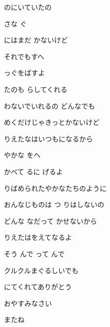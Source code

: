 \documentclass[14pt]{extreport}
\begin{document}
{  のにいていたの
  \jisho{}

  さな ぐ
  \jisho{}

\item
  にはまだ かないけど
  \jisho{}

  それでもすへ
  \jisho{}

  っぐをばすよ
  \jisho{}

\item
  たのも らしてくれる
  \jisho{}

  わないでいれるの どんなでも
  \jisho{}

  めくだけじゃきっとかないけど
  \jisho{}

  りえたなはいつもになるから
  \jisho{}

\item
  やかな をへ
  \jisho{}

  かべて るに げるよ
  \jisho{}

\item
  りばめられたやかなたちのように
  \jisho{}

  おんなじものは つ りはしないの
  \jisho{}

  どんな なだって かせないから
  \jisho{}

  りえたはをえてなるよ
  \jisho{}

\item
  そう んで って んで
  \jisho{}

  クルクルまぐるしいでも
  \jisho{}

  にてくれてありがとう
  \jisho{}

  おやすみなさい
  \jisho{}

  またね
  \jisho{}


}
\end{document}
